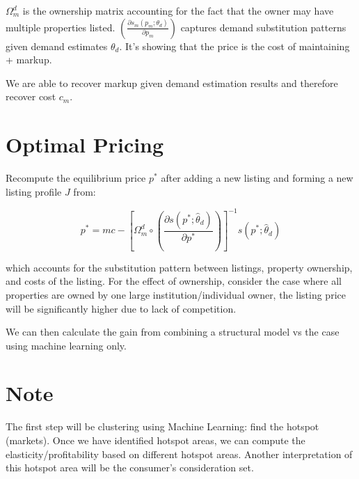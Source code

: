 \documentclass{article}
\begin{document}
$\Omega_m^d$ is the ownership matrix accounting for the fact that the owner may have multiple properties listed. $(\frac{\partial s_m(p_m;\theta_{d})}{\partial p_m})$ captures demand substitution patterns given demand estimates $\theta_{d}$.  It's showing that the price is the cost of maintaining + markup.

We are able to recover markup given demand estimation results and therefore recover cost $c_m$. 

\section{Optimal Pricing}

Recompute the equilibrium price $p^*$ after adding a new listing and forming a new listing profile $J$ from: 

\[p^*=mc-\left[\Omega_m^d\circ (\frac{\partial s(p^*;\hat{\theta}_{d})}{\partial p^*})\right]^{-1} s(p^*;\hat{\theta}_{d}) 
\] 

which accounts for the substitution pattern between listings, property ownership, and costs of the listing. For the effect of ownership, consider the case where all properties are owned by one large institution/individual owner, the listing price will be significantly higher due to lack of competition.   

We can then calculate the gain from combining a structural model vs the case using machine learning only. 









\section{Note}
The first step will be clustering using Machine Learning: find the hotspot (markets). Once we have identified hotspot areas, we can compute the elasticity/profitability based on different hotspot areas.  Another interpretation of this hotspot area will be the consumer's consideration set. 
\end{document}
